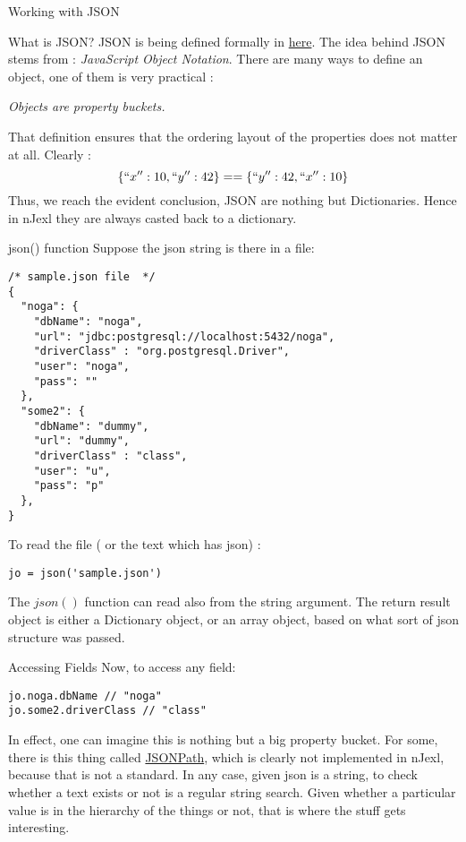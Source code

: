 \begin{section}{Working with JSON}

\begin{subsection}{What is JSON?}
JSON is being defined formally in \href{http://www.json.org}{here}.
The idea behind JSON stems from : \emph{JavaScript Object Notation}.
There are many ways to define an object, one of them is very practical :
\begin{center}
\emph{Objects are property buckets.}
\end{center}

That definition ensures that the ordering layout of the properties does not matter at all.
Clearly :
$$
\{  ``x'' : 10 , ``y'' : 42 \} == \{  ``y'' : 42 , ``x'' : 10 \}
$$
Thus, we reach the evident conclusion, JSON are nothing but Dictionaries.
Hence in nJexl they are always casted back to a dictionary.

\end{subsection}

\begin{subsection}{json() function}
Suppose the json string is there in a file:

\begin{lstlisting}[style=JexlStyle]
/* sample.json file  */
{
  "noga": {
    "dbName": "noga",
    "url": "jdbc:postgresql://localhost:5432/noga",
    "driverClass" : "org.postgresql.Driver",
    "user": "noga",
    "pass": ""
  },
  "some2": {
    "dbName": "dummy",
    "url": "dummy",
    "driverClass" : "class",
    "user": "u",
    "pass": "p"
  },
}
\end{lstlisting}
To read the file ( or the text which has json) :
\begin{lstlisting}[style=JexlStyle]
jo = json('sample.json')
\end{lstlisting}
The $json()$ function can read also from the string argument.
The return result object is either a Dictionary object, 
or an array object, based on what sort of json structure was passed.
\end{subsection}

\begin{subsection}{Accessing Fields}
Now, to access any field:
\begin{lstlisting}[style=JexlStyle]
jo.noga.dbName // "noga"
jo.some2.driverClass // "class" 
\end{lstlisting}
In effect, one can imagine this is nothing but a big property bucket.
For some, there is this thing called \href{http://goessner.net/articles/JsonPath/}{JSONPath}, 
which is clearly not implemented in nJexl, because that is not a standard.
In any case, given json is a string, to check whether a text exists or not is a regular string search.
Given whether a particular value is in the hierarchy of the things or not, 
that is where the stuff gets interesting. 


\end{subsection}
\end{section}
